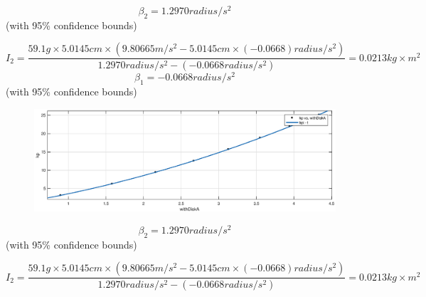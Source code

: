 $$ \beta_2 = 1.2970 radius/s^2$$ (with 95\% confidence bounds) 

$$ I_2 = \frac{59.1 g \times 5.0145 cm \times (9.80665 m/s^2 - 5.0145 cm \times (-0.0668) radius/s^2 )}{1.2970 radius/s^2 -(-0.0668 radius/s^2) } = 0.0213 kg\times m^2 $$$$ \beta_1 = -0.0668 radius/s^2$$ (with 95\% confidence bounds) 

\begin{figure}[H]
\centering
\includegraphics[width=\EFWwr]{matlab/wda}
\end{figure}

$$ \beta_2 = 1.2970 radius/s^2$$ (with 95\% confidence bounds) 

$$ I_2 = \frac{59.1 g \times 5.0145 cm \times (9.80665 m/s^2 - 5.0145 cm \times (-0.0668) radius/s^2 )}{1.2970 radius/s^2 -(-0.0668 radius/s^2) } = 0.0213 kg\times m^2 $$

 

